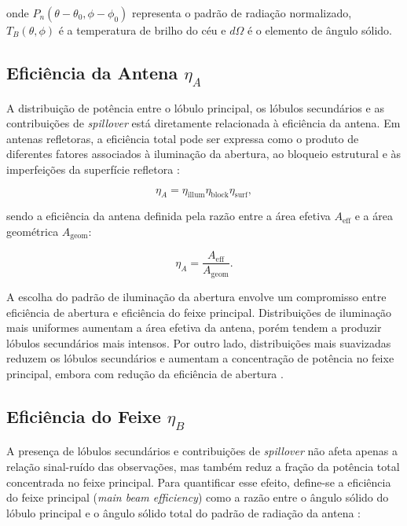 onde $P_n(\theta - \theta_0,\phi - \phi_0)$ representa o padrão de radiação normalizado, $T_B(\theta,\phi)$ é a temperatura de brilho do céu e $d\Omega$ é o elemento de ângulo sólido.


\subsection{Eficiência da Antena $\eta_A$}
A distribuição de potência entre o lóbulo principal, os lóbulos secundários e as contribuições de \textit{spillover} está diretamente relacionada à eficiência da antena. Em antenas refletoras, a eficiência total pode ser expressa como o produto de diferentes fatores associados à iluminação da abertura, ao bloqueio estrutural e às imperfeições da superfície refletora \cite{burke2019introduction}:

\begin{equation}
\eta_A =
\eta_{\mathrm{illum}}
\eta_{\mathrm{block}}
\eta_{\mathrm{surf}},
\end{equation}

sendo a eficiência da antena definida pela razão entre a área efetiva \(A_{\mathrm{eff}}\) e a área geométrica \(A_{\mathrm{geom}}\):

\begin{equation}
\eta_A =
\frac{A_{\mathrm{eff}}}
{A_{\mathrm{geom}}}.
\end{equation}

A escolha do padrão de iluminação da abertura envolve um compromisso entre eficiência de abertura e eficiência do feixe principal. Distribuições de iluminação mais uniformes aumentam a área efetiva da antena, porém tendem a produzir lóbulos secundários mais intensos. Por outro lado, distribuições mais suavizadas reduzem os lóbulos secundários e aumentam a concentração de potência no feixe principal, embora com redução da eficiência de abertura \cite{burke2019introduction}.

\subsection{Eficiência do Feixe $\eta_B$}
A presença de lóbulos secundários e contribuições de \textit{spillover} não afeta apenas a relação sinal-ruído das observações, mas também reduz a fração da potência total concentrada no feixe principal. Para quantificar esse efeito, define-se a eficiência do feixe principal (\textit{main beam efficiency}) como a razão entre o ângulo sólido do lóbulo principal e o ângulo sólido total do padrão de radiação da antena \cite{wilson2013tools}:

